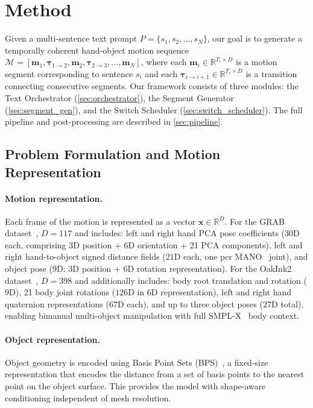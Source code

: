 \documentclass[runningheads]{llncs}
\newcommand{\bx}{\mathbf{x}}
\newcommand{\bm}{\mathbf{m}}
\newcommand{\btau}{\boldsymbol{\tau}}
\begin{document}
\section{Method}
\label{sec:method}

Given a multi-sentence text prompt $P = \{s_1, s_2, \ldots, s_N\}$, our goal is to generate a temporally coherent hand-object motion sequence $\mathcal{M} = [\bm_1, \btau_{1 \rightarrow 2}, \bm_2, \btau_{2 \rightarrow 3}, \ldots, \bm_N]$, where each $\bm_i \in \mathbb{R}^{T_i \times D}$ is a motion segment corresponding to sentence $s_i$ and each $\btau_{i \rightarrow i{+}1} \in \mathbb{R}^{T_\tau \times D}$ is a transition connecting consecutive segments.
Our framework consists of three modules: the Text Orchestrator (\cref{sec:orchestrator}), the Segment Generator (\cref{sec:segment_gen}), and the Switch Scheduler (\cref{sec:switch_scheduler}).
The full pipeline and post-processing are described in \cref{sec:pipeline}.

\subsection{Problem Formulation and Motion Representation}
\label{sec:representation}

\paragraph{Motion representation.}
Each frame of the motion is represented as a vector $\bx \in \mathbb{R}^D$.
For the GRAB dataset~\cite{taheri2020grab}, $D = 117$ and includes:
left and right hand PCA pose coefficients ($30$D each, comprising 3D position + 6D orientation + 21 PCA components),
left and right hand-to-object signed distance fields ($21$D each, one per MANO~\cite{romero2022mano} joint), and
object pose ($9$D: 3D position + 6D rotation representation).
For the OakInk2 dataset~\cite{zhan2024oakink2}, $D = 398$ and additionally includes:
body root translation and rotation ($9$D),
21 body joint rotations ($126$D in 6D representation),
left and right hand quaternion representations ($67$D each), and
up to three object poses ($27$D total), enabling bimanual multi-object manipulation with full SMPL-X~\cite{pavlakos2019expressive} body context.

\paragraph{Object representation.}
Object geometry is encoded using Basis Point Sets (BPS)~\cite{prokudin2019efficient}, a fixed-size representation that encodes the distance from a set of basis points to the nearest point on the object surface.
This provides the model with shape-aware conditioning independent of mesh resolution.
\end{document}
